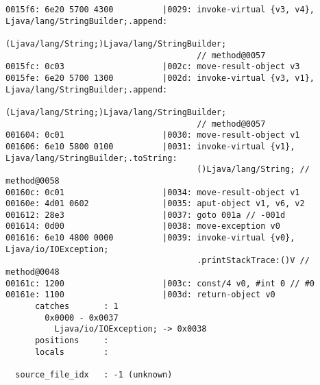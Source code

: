 \begin{lstlisting}
0015f6: 6e20 5700 4300          |0029: invoke-virtual {v3, v4}, Ljava/lang/StringBuilder;.append:
                                       (Ljava/lang/String;)Ljava/lang/StringBuilder;
                                       // method@0057
0015fc: 0c03                    |002c: move-result-object v3
0015fe: 6e20 5700 1300          |002d: invoke-virtual {v3, v1}, Ljava/lang/StringBuilder;.append:
                                       (Ljava/lang/String;)Ljava/lang/StringBuilder;
                                       // method@0057
001604: 0c01                    |0030: move-result-object v1
001606: 6e10 5800 0100          |0031: invoke-virtual {v1}, Ljava/lang/StringBuilder;.toString:
                                       ()Ljava/lang/String; // method@0058
00160c: 0c01                    |0034: move-result-object v1
00160e: 4d01 0602               |0035: aput-object v1, v6, v2
001612: 28e3                    |0037: goto 001a // -001d
001614: 0d00                    |0038: move-exception v0
001616: 6e10 4800 0000          |0039: invoke-virtual {v0}, Ljava/io/IOException;
                                       .printStackTrace:()V // method@0048
00161c: 1200                    |003c: const/4 v0, #int 0 // #0
00161e: 1100                    |003d: return-object v0
      catches       : 1
        0x0000 - 0x0037
          Ljava/io/IOException; -> 0x0038
      positions     :
      locals        :

  source_file_idx   : -1 (unknown)
\end{lstlisting}
